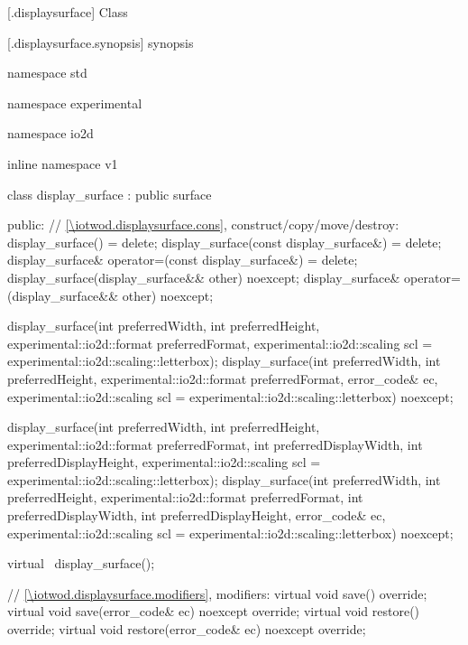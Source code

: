  [\iotwod.displaysurface] {Class }

 [\iotwod.displaysurface.synopsis] { synopsis}

\begin{codeblock}
namespace std { namespace experimental { namespace io2d { inline namespace v1 {
  class display_surface : public surface {
  public:
    // \ref{\iotwod.displaysurface.cons}, construct/copy/move/destroy:
    display_surface() = delete;
    display_surface(const display_surface&) = delete;
    display_surface& operator=(const display_surface&) = delete;
    display_surface(display_surface&& other) noexcept;
    display_surface& operator=(display_surface&& other) noexcept;
    
    display_surface(int preferredWidth, int preferredHeight, 
      experimental::io2d::format preferredFormat,
      experimental::io2d::scaling scl = experimental::io2d::scaling::letterbox);
    display_surface(int preferredWidth, int preferredHeight, 
      experimental::io2d::format preferredFormat, error_code& ec,
      experimental::io2d::scaling scl = experimental::io2d::scaling::letterbox)
      noexcept;
    
    display_surface(int preferredWidth, int preferredHeight, 
      experimental::io2d::format preferredFormat,
      int preferredDisplayWidth, int preferredDisplayHeight,
      experimental::io2d::scaling scl = experimental::io2d::scaling::letterbox);
    display_surface(int preferredWidth, int preferredHeight, 
      experimental::io2d::format preferredFormat,
      int preferredDisplayWidth, int preferredDisplayHeight, error_code& ec,
      experimental::io2d::scaling scl = experimental::io2d::scaling::letterbox) 
      noexcept;
    
    virtual ~display_surface();
    
    // \ref{\iotwod.displaysurface.modifiers}, modifiers:
    virtual void save() override;
    virtual void save(error_code& ec) noexcept override;
    virtual void restore() override;
    virtual void restore(error_code& ec) noexcept override;
    
}}}}}
\end{codeblock}
